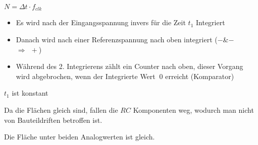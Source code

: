 \documentclass[letterpaper,10pt,english]{jupyterBook}
\begin{document}
\sphinxAtStartPar
\(N = \Delta t \cdot f_{clk}\)

\begin{DUlineblock}{0em}
\item[] 
\end{DUlineblock}

\begin{DUlineblock}{0em}
\item[] 
\end{DUlineblock}

\sphinxAtStartPar
{}

\begin{DUlineblock}{0em}
\item[] 
\end{DUlineblock}
\begin{itemize}
\item {} 
\sphinxAtStartPar
Es wird nach der Eingangsspannung invers für die Zeit \(t_1\) Integriert

\item {} 
\sphinxAtStartPar
Danach wird nach einer Referenzspannung nach oben integriert (\(-\)\&\(-\) \(\Rightarrow~~+\))

\item {} 
\sphinxAtStartPar
Während des 2. Integrierens zählt ein Counter nach oben,
dieser Vorgang wird abgebrochen, wenn der Integrierte Wert \(~0\) erreicht (Komparator)

\end{itemize}

\sphinxAtStartPar
{} \(t_1\) ist konstant

\sphinxAtStartPar
Da die Flächen gleich sind, fallen die \(RC\) Komponenten weg, wodurch man nicht von Bauteildriften betroffen ist.

\begin{DUlineblock}{0em}
\item[] 
\end{DUlineblock}

\sphinxAtStartPar
{}

\begin{DUlineblock}{0em}
\item[] 
\end{DUlineblock}

\sphinxAtStartPar
Die Fläche unter beiden Analogwerten ist gleich.
\end{document}
